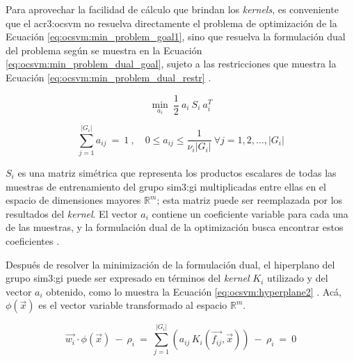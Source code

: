 Para aprovechar la facilidad de cálculo que brindan los \textit{kernels},
es conveniente que el \gls{acr3:ocsvm} no resuelva directamente el
problema de optimización de la Ecuación \ref{eq:ocsvm:min_problem_goal1},
sino que resuelva la formulación dual del problema según se muestra en
la Ecuación \ref{eq:ocsvm:min_problem_dual_goal}, sujeto a las restricciones
que muestra la Ecuación \ref{eq:ocsvm:min_problem_dual_restr}
\cite{aggarwal2013outlier}. %

\begin{equation}
    \label{eq:ocsvm:min_problem_dual_goal}
    \min_{a_{i}}
    \
    \frac{1}{2} \ a_{i} \ S_{i} \ a_{i}^{T}
\end{equation}

\begin{equation}
    \label{eq:ocsvm:min_problem_dual_restr}
    \sum_{j=1}^{\lvert G_{i} \rvert} a_{ij} \ = \ 1
    \ , \quad
    0 \leqslant a_{ij} \leqslant \frac{1}{\nu_{i} \lvert G_{i} \rvert}
    \
    \forall j = 1,2, \dots, \lvert G_{i} \rvert
\end{equation}

$S_{i}$ es una matriz simétrica que representa los productos escalares de
todas las muestras de entrenamiento del grupo \gls{sim3:gi} multiplicadas
entre ellas en el espacio de dimensiones mayores $\mathbb{R}^{m}$;
esta matriz puede ser reemplazada por los resultados del \textit{kernel}.
El vector $a_{i}$ contiene un coeficiente variable para cada una de las
muestras, y la formulación dual de la optimización busca encontrar estos
coeficientes
\cite{aggarwal2013outlier}. %

Después de resolver la minimización de la formulación dual, el hiperplano
del grupo \gls{sim3:gi} puede ser expresado en términos del \textit{kernel}
$K_{i}$ utilizado y del vector $a_{i}$ obtenido, como lo muestra la
Ecuación \ref{eq:ocsvm:hyperplane2}
\cite{aggarwal2013outlier}. %
Acá, $\phi(\vec{x})$ es el vector variable transformado al espacio
$\mathbb{R}^{m}$.

\begin{equation}
    \label{eq:ocsvm:hyperplane2}
    \vec{w_{i}} \cdot \phi(\vec{x})
    \ - \
    \rho_{i}
    \ = \
    \sum_{j=1}^{\lvert G_{i} \rvert}
    \left(
        a_{ij} \, K_{i}(\vec{f_{ij}}, \vec{x})
    \right)
    \ - \
    \rho_{i}
    \ = \
    0
\end{equation}


